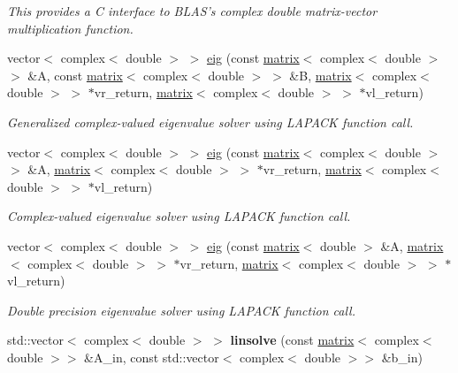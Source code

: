 \begin{DoxyCompactItemize}
\begin{DoxyCompactList}\small\item\em This provides a C interface to B\-L\-A\-S's complex double matrix-\/vector multiplication function. \end{DoxyCompactList}\item 
vector$<$ complex$<$ double $>$ $>$ \hyperlink{namespacekeycpp_a524691df2a648a59b3be9f2b2362bbe8}{eig} (const \hyperlink{classkeycpp_1_1matrix}{matrix}$<$ complex$<$ double $>$ $>$ \&A, const \hyperlink{classkeycpp_1_1matrix}{matrix}$<$ complex$<$ double $>$ $>$ \&B, \hyperlink{classkeycpp_1_1matrix}{matrix}$<$ complex$<$ double $>$ $>$ $\ast$vr\-\_\-return, \hyperlink{classkeycpp_1_1matrix}{matrix}$<$ complex$<$ double $>$ $>$ $\ast$vl\-\_\-return)
\begin{DoxyCompactList}\small\item\em Generalized complex-\/valued eigenvalue solver using L\-A\-P\-A\-C\-K function call. \end{DoxyCompactList}\item 
vector$<$ complex$<$ double $>$ $>$ \hyperlink{namespacekeycpp_ab2aef1f33c78911d0ebcd77f9c9841fe}{eig} (const \hyperlink{classkeycpp_1_1matrix}{matrix}$<$ complex$<$ double $>$ $>$ \&A, \hyperlink{classkeycpp_1_1matrix}{matrix}$<$ complex$<$ double $>$ $>$ $\ast$vr\-\_\-return, \hyperlink{classkeycpp_1_1matrix}{matrix}$<$ complex$<$ double $>$ $>$ $\ast$vl\-\_\-return)
\begin{DoxyCompactList}\small\item\em Complex-\/valued eigenvalue solver using L\-A\-P\-A\-C\-K function call. \end{DoxyCompactList}\item 
vector$<$ complex$<$ double $>$ $>$ \hyperlink{namespacekeycpp_a7cc3fb9ca244e5caac42cf94013ddf94}{eig} (const \hyperlink{classkeycpp_1_1matrix}{matrix}$<$ double $>$ \&A, \hyperlink{classkeycpp_1_1matrix}{matrix}$<$ complex$<$ double $>$ $>$ $\ast$vr\-\_\-return, \hyperlink{classkeycpp_1_1matrix}{matrix}$<$ complex$<$ double $>$ $>$ $\ast$vl\-\_\-return)
\begin{DoxyCompactList}\small\item\em Double precision eigenvalue solver using L\-A\-P\-A\-C\-K function call. \end{DoxyCompactList}\item 
\hypertarget{namespacekeycpp_acea0bb8f128ef0cdf55a79c50ceccb83}{std\-::vector$<$ complex$<$ double $>$ $>$ {\bfseries linsolve} (const \hyperlink{classkeycpp_1_1matrix}{matrix}$<$ complex$<$ double $>$$>$ \&A\-\_\-in, const std\-::vector$<$ complex$<$ double $>$$>$ \&b\-\_\-in)}\label{namespacekeycpp_acea0bb8f128ef0cdf55a79c50ceccb83}


\end{DoxyCompactItemize}
